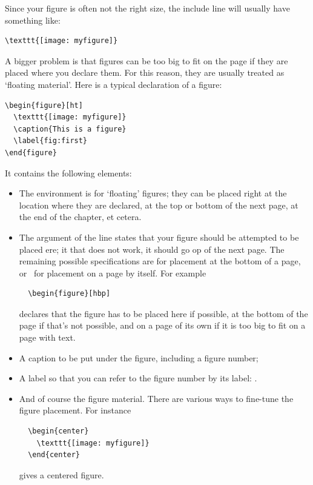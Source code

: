 Since your figure is often not the right size, the include line will
usually have something like:
\begin{verbatim}
\texttt{[image: myfigure]}  
\end{verbatim}
A bigger problem is that figures can be too big to fit on the page if
they are placed where you declare them. For this reason, they are
usually treated as `floating material'. Here is a typical  declaration
of a figure:
\begin{verbatim}
\begin{figure}[ht]
  \texttt{[image: myfigure]}
  \caption{This is a figure}
  \label{fig:first}
\end{figure}
\end{verbatim}
It contains the following elements:
\begin{itemize}
\item The  environment is for `floating' figures; they can
  be placed right at the location where they are declared, at the top
  or bottom of the next page, at the end of the chapter, et cetera.
\item The \n{[ht]} argument of the  line
  states that your figure should be attempted to be placed ere; it
  that does not work, it should go op of the next page. The
  remaining possible specifications are  for placement at the bottom of a
  page, or ~for placement on a page by itself. For example
\begin{verbatim}
  \begin{figure}[hbp]
\end{verbatim}
  declares that the figure has to be placed here if possible, at the
  bottom of the page if that's not possible, and on a page of its
  own if it is too big to fit on a page with text.
\item A caption to be put under the figure, including a figure number;
\item A label so that you can refer to the figure number by its label:
  .
\item And of course the figure material. There are various ways to
  fine-tune the figure placement. For instance
\begin{verbatim}
  \begin{center}
    \texttt{[image: myfigure]}
  \end{center}
\end{verbatim}
  gives a centered figure.
\end{itemize}

